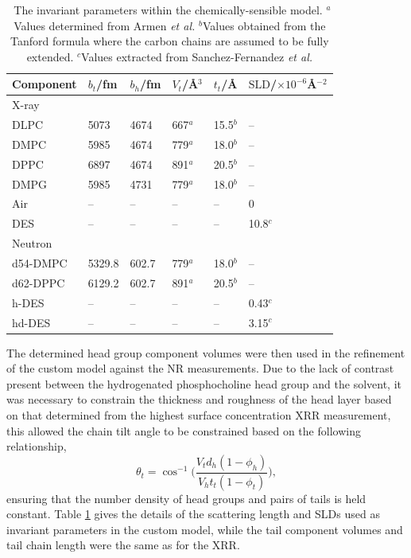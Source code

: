 \documentclass[twoside,twocolumn,9pt]{article}
\begin{document}
\begin{table}[h]
	\small
	\caption{\ The invariant parameters within the chemically-sensible model. $^a$Values determined from Armen \emph{et al.}\cite{Armen1998} $^b$Values obtained from the Tanford formula where the carbon chains are assumed to be fully extended.\cite{Tanford1980} $^c$Values extracted from Sanchez-Fernandez \emph{et al.}\cite{Sanchez-Fernandez2016}}
	\label{tab:invariant}
	\begin{tabular*}{0.48\textwidth}{@{\extracolsep{\fill}}llllll}
		\hline
		Component & $b_t$/fm & $b_h$/fm & $V_t$/\AA$^3$ & $t_t$/\AA & $\text{SLD}$/$\times10^{-6}$\AA$^{-2}$ \\
		\hline
		X-ray & & & & & \\
		DLPC & 5073 & 4674 & 667$^a$ & 15.5$^b$ & -- \\
		DMPC & 5985 & 4674 & 779$^a$ & 18.0$^b$ & -- \\
		DPPC & 6897 & 4674 & 891$^a$ & 20.5$^b$ & -- \\
		DMPG & 5985 & 4731 & 779$^a$ & 18.0$^b$ & --\\
		Air & -- & -- & -- & -- & 0\\
		DES & -- & -- & -- & -- & 10.8$^c$ \\
		\hline
		Neutron & & & & & \\
		d54-DMPC & 5329.8 & 602.7 & 779$^a$ & 18.0$^b$ & -- \\
		d62-DPPC & 6129.2 & 602.7 & 891$^a$ & 20.5$^b$ & -- \\
		h-DES & -- & -- & -- & -- & 0.43$^c$  \\
		hd-DES & -- & -- & -- & -- & 3.15$^c$ \\
		\hline
	\end{tabular*}
\end{table}

The determined head group component volumes were then used in the refinement of the custom model against the NR measurements. Due to the lack of contrast present between the hydrogenated phosphocholine head group and the solvent, it was necessary to constrain the thickness and roughness of the head layer based on that determined from the highest surface concentration XRR measurement, this allowed the chain tilt angle to be constrained based on the following relationship, 
\begin{equation}
\label{equ:ct}
\theta_t = \cos^{-1}\bigg(\frac{V_td_h(1-\phi_h)}{V_ht_t(1-\phi_t)}\bigg),
\end{equation}
ensuring that the number density of head groups and pairs of tails is held constant. Table \ref{tab:invariant} gives the details of the scattering length and SLDs used as invariant parameters in the custom model, while the tail component volumes and tail chain length were the same as for the XRR. 
\end{document}
